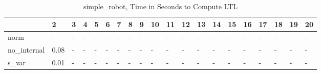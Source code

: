 \begin{table}
\caption{simple_robot, Time in Seconds to Compute LTL}
\label{simple_robot_LTL_time}
\begin{tabular}{llllllllllllllllllll}
\toprule
 & 2 & 3 & 4 & 5 & 6 & 7 & 8 & 9 & 10 & 11 & 12 & 13 & 14 & 15 & 16 & 17 & 18 & 19 & 20 \\
\midrule
norm & - & - & - & - & - & - & - & - & - & - & - & - & - & - & - & - & - & - & - \\
no_internal & 0.08 & - & - & - & - & - & - & - & - & - & - & - & - & - & - & - & - & - & - \\
s_var & 0.01 & - & - & - & - & - & - & - & - & - & - & - & - & - & - & - & - & - & - \\
\bottomrule
\end{tabular}
\end{table}
